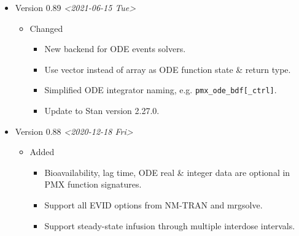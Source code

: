 \documentclass[12pt, reqno, oneside]{amsbook}
\numberwithin{equation}{chapter}
\numberwithin{figure}{chapter}
\numberwithin{table}{chapter}
\theoremstyle{remark}
\begin{document}
\begin{itemize}
\begin{itemize}
\begin{itemize}
\item Update to Stan version 2.29.2.
\end{itemize}
\end{itemize}
\item Version 0.89 \textit{<2021-06-15 Tue>}
\begin{itemize}
\item Changed
\begin{itemize}
\item New backend for ODE events solvers.
\item Use vector instead of array as ODE function state \& return type.
\item Simplified ODE integrator naming, e.g. \texttt{pmx\_ode\_bdf[\_ctrl]}.
\item Update to Stan version 2.27.0.
\end{itemize}
\end{itemize}
\item Version 0.88 \textit{<2020-12-18 Fri>}
\begin{itemize}
\item Added
\begin{itemize}
\item Bioavailability, lag time, ODE real \& integer data are optional in PMX function signatures.
\item Support all EVID options from NM-TRAN and mrgsolve.
\item Support steady-state infusion through multiple interdose intervals.
\end{itemize}
\end{itemize}


\end{itemize}
\end{document}
